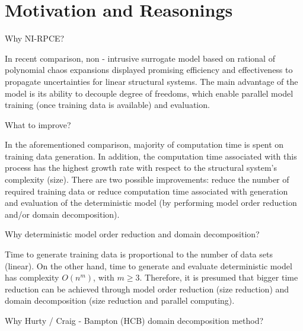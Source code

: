 \documentclass[a4paper,oneside,10pt]{article}
\begin{document}
\setlength{\headheight}{50pt}



\thispagestyle{titlepage} 
\pagestyle{fancy}
\fancyhf{}
\renewcommand{\headrulewidth}{0.0pt}
\renewcommand{\footrulewidth}{0.0pt}
\fancyfoot[C]{\thepage}

\section*{Motivation and Reasonings}
\begin{singlespace}
Why NI-RPCE? 
\vspace{10pt} 

In recent comparison, non - intrusive surrogate model based on rational of polynomial chaos expansions displayed promising efficiency and effectiveness to propagate uncertainties for linear structural systems. 
The main advantage of the model is its ability to decouple degree of freedoms, which enable parallel model training (once training data is available) and evaluation. 
\vspace{10pt} 

What to improve? 
\vspace{10pt} 

In the aforementioned comparison, majority of computation time is spent on training data generation.
In addition, the computation time associated with this process has the highest growth rate with respect to the structural system's complexity (size). 
There are two possible improvements: reduce the number of required training data or reduce computation time associated with generation and evaluation of the deterministic model (by performing model order reduction and/or domain decomposition). 
\vspace{10pt} 

Why deterministic model order reduction and domain decomposition?
\vspace{10pt} 

Time to generate training data is proportional to the number of data sets (linear). 
On the other hand, time to generate and evaluate deterministic model has complexity $O\left(n^{m}\right)$, with $m\geq 3$. 
Therefore, it is presumed that bigger time reduction can be achieved through model order reduction (size reduction) and domain decomposition (size reduction and parallel computing). 
\vspace{10pt} 

Why Hurty / Craig - Bampton (HCB) domain decomposition method? 
\vspace{10pt} 


\end{singlespace}
\end{document}
